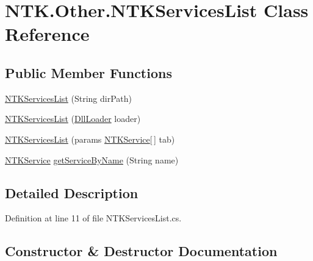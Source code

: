\hypertarget{class_n_t_k_1_1_other_1_1_n_t_k_services_list}{}\section{N\+T\+K.\+Other.\+N\+T\+K\+Services\+List Class Reference}
\label{class_n_t_k_1_1_other_1_1_n_t_k_services_list}
\subsection*{Public Member Functions}
\begin{DoxyCompactItemize}
\item 
\mbox{\hyperlink{class_n_t_k_1_1_other_1_1_n_t_k_services_list_aeb5e2f19fe8323f2e42e40adb3dd7d1c}{N\+T\+K\+Services\+List}} (String dir\+Path)
\item 
\mbox{\hyperlink{class_n_t_k_1_1_other_1_1_n_t_k_services_list_acf41b42b6b534cc9198149ae1febbf55}{N\+T\+K\+Services\+List}} (\mbox{\hyperlink{class_n_t_k_1_1_i_o_1_1_dll_loader}{Dll\+Loader}} loader)
\item 
\mbox{\hyperlink{class_n_t_k_1_1_other_1_1_n_t_k_services_list_ae385c94ba1254b864139e79690016116}{N\+T\+K\+Services\+List}} (params \mbox{\hyperlink{class_n_t_k_1_1_service_1_1_n_t_k_service}{N\+T\+K\+Service}}\mbox{[}$\,$\mbox{]} tab)
\item 
\mbox{\hyperlink{class_n_t_k_1_1_service_1_1_n_t_k_service}{N\+T\+K\+Service}} \mbox{\hyperlink{class_n_t_k_1_1_other_1_1_n_t_k_services_list_a784f569e07c154a71c7d4b4e55dcfda8}{get\+Service\+By\+Name}} (String name)
\end{DoxyCompactItemize}


\subsection{Detailed Description}


Definition at line 11 of file N\+T\+K\+Services\+List.\+cs.



\subsection{Constructor \& Destructor Documentation}
\mbox{\label{class_n_t_k_1_1_other_1_1_n_t_k_services_list_aeb5e2f19fe8323f2e42e40adb3dd7d1c}} 
